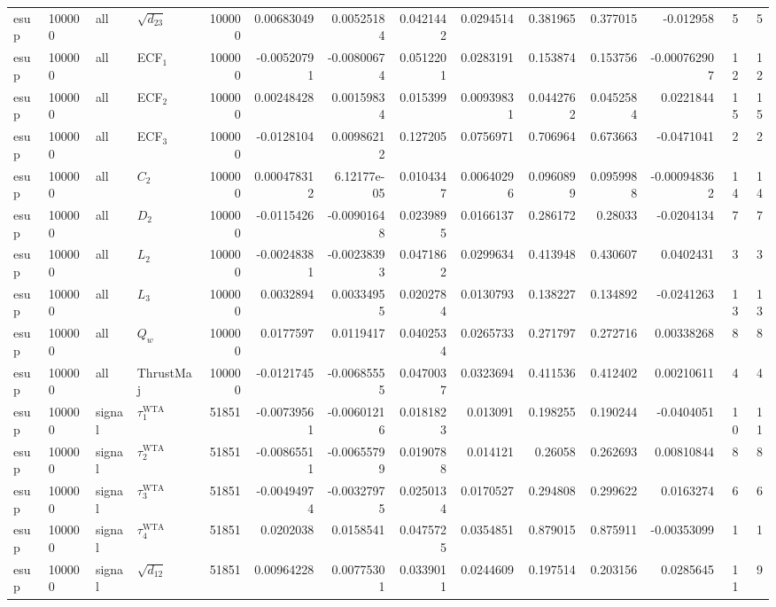 \begin{landscape}
\begin{longtable}{llll r rrrr rr r rr}
esup & 100000 & all & $\sqrt{d_{23}}$ & 100000 & 0.00683049 & 0.00525184 & 0.0421442 & 0.0294514 & 0.381965 & 0.377015 & -0.012958 & 5 & 5 \\
esup & 100000 & all & ECF$_1$ & 100000 & -0.00520791 & -0.00800674 & 0.0512201 & 0.0283191 & 0.153874 & 0.153756 & -0.000762907 & 12 & 12 \\
esup & 100000 & all & ECF$_2$ & 100000 & 0.00248428 & 0.00159834 & 0.015399 & 0.00939831 & 0.0442762 & 0.0452584 & 0.0221844 & 15 & 15 \\
esup & 100000 & all & ECF$_3$ & 100000 & -0.0128104 & 0.00986212 & 0.127205 & 0.0756971 & 0.706964 & 0.673663 & -0.0471041 & 2 & 2 \\
esup & 100000 & all & $C_2$ & 100000 & 0.000478312 & 6.12177e-05 & 0.0104347 & 0.00640296 & 0.0960899 & 0.0959988 & -0.000948362 & 14 & 14 \\
esup & 100000 & all & $D_2$ & 100000 & -0.0115426 & -0.00901648 & 0.0239895 & 0.0166137 & 0.286172 & 0.28033 & -0.0204134 & 7 & 7 \\
esup & 100000 & all & $L_2$ & 100000 & -0.00248381 & -0.00238393 & 0.0471862 & 0.0299634 & 0.413948 & 0.430607 & 0.0402431 & 3 & 3 \\
esup & 100000 & all & $L_3$ & 100000 & 0.0032894 & 0.00334955 & 0.0202784 & 0.0130793 & 0.138227 & 0.134892 & -0.0241263 & 13 & 13 \\
esup & 100000 & all & $Q_w$ & 100000 & 0.0177597 & 0.0119417 & 0.0402534 & 0.0265733 & 0.271797 & 0.272716 & 0.00338268 & 8 & 8 \\
esup & 100000 & all & ThrustMaj & 100000 & -0.0121745 & -0.00685555 & 0.0470037 & 0.0323694 & 0.411536 & 0.412402 & 0.00210611 & 4 & 4 \\
esup & 100000 & signal & $\tau_1^{\mathrm{WTA}}$ & 51851 & -0.00739561 & -0.00601216 & 0.0181823 & 0.013091 & 0.198255 & 0.190244 & -0.0404051 & 10 & 11 \\
esup & 100000 & signal & $\tau_2^{\mathrm{WTA}}$ & 51851 & -0.00865511 & -0.00655799 & 0.0190788 & 0.014121 & 0.26058 & 0.262693 & 0.00810844 & 8 & 8 \\
esup & 100000 & signal & $\tau_3^{\mathrm{WTA}}$ & 51851 & -0.00494974 & -0.00327975 & 0.0250134 & 0.0170527 & 0.294808 & 0.299622 & 0.0163274 & 6 & 6 \\
esup & 100000 & signal & $\tau_4^{\mathrm{WTA}}$ & 51851 & 0.0202038 & 0.0158541 & 0.0475725 & 0.0354851 & 0.879015 & 0.875911 & -0.00353099 & 1 & 1 \\
esup & 100000 & signal & $\sqrt{d_{12}}$ & 51851 & 0.00964228 & 0.00775301 & 0.0339011 & 0.0244609 & 0.197514 & 0.203156 & 0.0285645 & 11 & 9 \\

\end{longtable}
\end{landscape}
